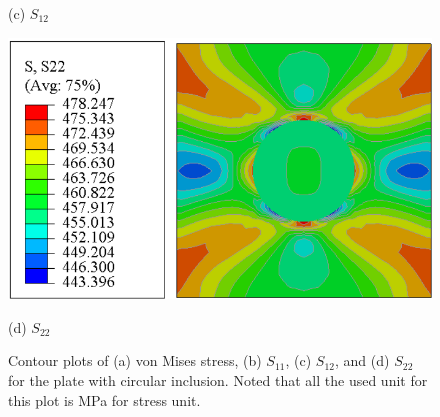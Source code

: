 \documentclass[12pt]{article}
\begin{document}
\begin{figure}[H]
\begin{minipage}{0.48\textwidth}
        \caption*{(c) $S_{12}$}
    \end{minipage}
    \hfill
    \begin{minipage}{0.48\textwidth}
        \centering
        \includegraphics[width=\textwidth]{images/S22.png}
        \caption*{(d) $S_{22}$}
    \end{minipage}
    \caption{Contour plots of (a) von Mises stress, (b) $S_{11}$, (c) $S_{12}$, and (d) $S_{22}$ for the plate with circular inclusion.
    Noted that all the used unit for this plot is MPa for stress unit.}
    \label{fig:stressFieldsall}
\end{figure}
\end{document}
